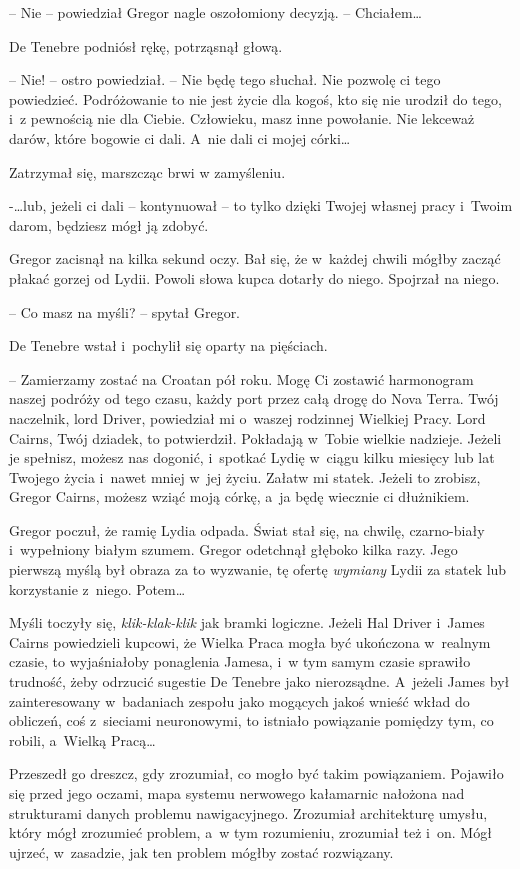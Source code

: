 \documentclass[oneside,polish,12pt,sfheadings]{mwbk}
\begin{document}
-- Nie -- powiedział Gregor nagle oszołomiony decyzją. -- Chciałem\ldots

De Tenebre podniósł rękę, potrząsnął głową.

-- Nie! -- ostro powiedział. -- Nie będę tego słuchał. Nie pozwolę ci tego
powiedzieć. Podróżowanie to nie jest życie dla kogoś, kto się nie
urodził do tego, i~z pewnością nie dla Ciebie. Człowieku, masz inne
powołanie. Nie lekceważ darów, które bogowie ci dali. A~nie dali ci
mojej córki\ldots

Zatrzymał się, marszcząc brwi w zamyśleniu.

-\ldots lub, jeżeli ci dali -- kontynuował -- to tylko dzięki Twojej
własnej pracy i~Twoim darom, będziesz mógł ją zdobyć.

Gregor zacisnął na kilka sekund oczy. Bał się, że w~każdej chwili mógłby
zacząć płakać gorzej od Lydii. Powoli słowa kupca dotarły do niego.
Spojrzał na niego.

-- Co masz na myśli? -- spytał Gregor.

De Tenebre wstał i~pochylił się oparty na pięściach.

-- Zamierzamy zostać na Croatan pół roku. Mogę Ci zostawić harmonogram
naszej podróży od tego czasu, każdy port przez całą drogę do Nova Terra.
Twój naczelnik, lord Driver, powiedział mi o~waszej rodzinnej Wielkiej
Pracy. Lord Cairns, Twój dziadek, to potwierdził. Pokładają w~Tobie
wielkie nadzieje. Jeżeli je spełnisz, możesz nas dogonić, i~spotkać
Lydię w~ciągu kilku miesięcy lub lat Twojego życia i~nawet mniej w~jej
życiu. Załatw mi statek. Jeżeli to zrobisz, Gregor Cairns, możesz wziąć
moją córkę, a~ja będę wiecznie ci dłużnikiem.

Gregor poczuł, że ramię Lydia odpada. Świat stał się, na chwilę,
czarno-biały i~wypełniony białym szumem. Gregor odetchnął głęboko kilka
razy. Jego pierwszą myślą był obraza za to wyzwanie, tę ofertę
\emph{wymiany} Lydii za statek lub korzystanie z~niego. Potem\ldots

Myśli toczyły się, \emph{klik-klak-klik} jak bramki logiczne. Jeżeli Hal
Driver i~James Cairns powiedzieli kupcowi, że Wielka Praca mogła być
ukończona w~realnym czasie, to wyjaśniałoby ponaglenia Jamesa, i~w tym
samym czasie sprawiło trudność, żeby odrzucić sugestie De Tenebre jako
nierozsądne. A~jeżeli James był zainteresowany w~badaniach zespołu jako
mogących jakoś wnieść wkład do obliczeń, coś z~sieciami neuronowymi, to
istniało powiązanie pomiędzy tym, co robili, a~Wielką Pracą\ldots

Przeszedł go dreszcz, gdy zrozumiał, co mogło być takim powiązaniem.
Pojawiło się przed jego oczami, mapa systemu nerwowego kałamarnic
nałożona nad strukturami danych problemu nawigacyjnego. Zrozumiał
architekturę umysłu, który mógł zrozumieć problem, a~w tym rozumieniu,
zrozumiał też i~on. Mógł ujrzeć, w~zasadzie, jak ten problem mógłby
zostać rozwiązany.
\end{document}
